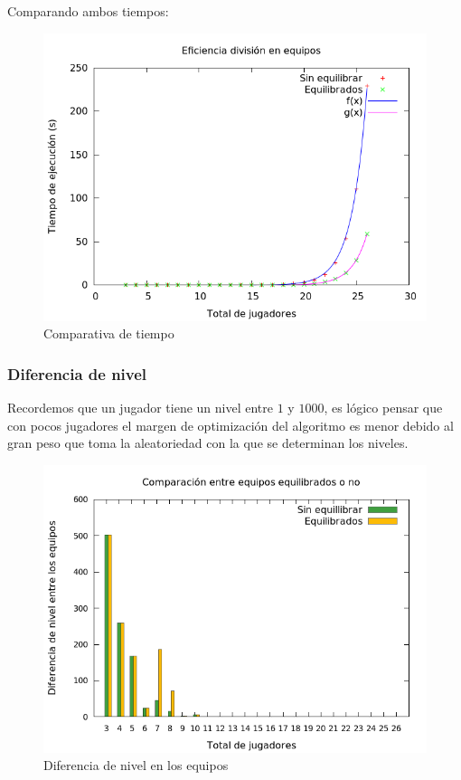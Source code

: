 Comparando ambos tiempos:

\begin{figure}[H]
    \centering
    \includegraphics[scale=0.5]{../Equipos/Graficas/tiempos.png}
    \caption{Comparativa de tiempo}
    \label{fig:divisionTiempos}
\end{figure}

\subsubsection{Diferencia de nivel}
Recordemos que un jugador tiene un nivel entre $1$ y $1000$, es lógico pensar que con pocos jugadores el margen de optimización del algoritmo es menor debido al gran peso que toma la aleatoriedad con la que se determinan los niveles.
\begin{figure}[H]
    \centering
    \includegraphics[scale=0.5]{../Equipos/Graficas/comparativa.png}
    \caption{Diferencia de nivel en los equipos}
    \label{fig:nivel}
\end{figure}

